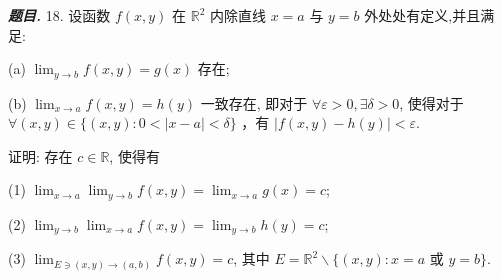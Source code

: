 \documentclass[10pt, a4paper, oneside]{ctexart}
\newenvironment{problem}{\begin{framed}\par\noindent\textbf{\textit{题目. }}}{\end{framed}\par}
\begin{document}
\begin{problem}
18. 设函数 $f(x, y)$ 在 $\mathbb{R}^2$ 内除直线 $x=a$ 与 $y=b$ 外处处有定义,并且满足:

(a) $\lim _{y \rightarrow b} f(x, y)=g(x)$ 存在;

(b) $\lim _{x \rightarrow a} f(x, y)=h(y)$ 一致存在, 即对于 $\forall \varepsilon>0, \exists \delta>0$, 使得对于 $\forall(x, y) \in\{(x, y): 0<|x-a|<\delta\}$ ，有 $|f(x, y)-h(y)|<\varepsilon$.

证明: 存在 $c \in \mathbb{R}$, 使得有

(1) $\lim _{x \rightarrow a} \lim _{y \rightarrow b} f(x, y)=\lim _{x \rightarrow a} g(x)=c$;

(2) $\lim _{y \rightarrow b} \lim _{x \rightarrow a} f(x, y)=\lim _{y \rightarrow b} h(y)=c$;

(3) $\lim _{E \ni(x, y) \rightarrow(a, b)} f(x, y)=c$, 其中 $E=\mathbb{R}^2 \backslash\{(x, y): x=a$ 或 $y=b\}$.
\end{problem}
\end{document}
